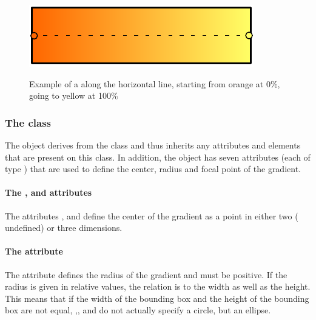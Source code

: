 \begin{figure}[!ht]
  \centering
  \includegraphics{figures/lingrad01.pdf}\\
  \caption{Example of a \LinearGradient along the horizontal line, starting from orange at 0\%, 
	 going to yellow at 100\%}
  \label{fig:lingrad}
\end{figure}


\subsubsection{The  class}
\label{radialgradient-class}


The \RadialGradient object derives from the \GradientBase class and thus
inherits any attributes and elements that are present on this class.
In addition, the \RadialGradient object has seven attributes (each of type \RelAbsVector) that are used to define the center, radius and focal point of the gradient.



\paragraph{The \fixttspace{}, \fixttspace{} and \fixttspace{} attributes}

The attributes ,  and  define the center of the gradient as a point in either two ( undefined) or three dimensions.


\paragraph{The \fixttspace{} attribute}

The attribute  defines the radius of the gradient and must be positive. If the radius is given in relative values, the relation is to the width as well as the height. This means that 
if the width of the bounding box and the height of the bounding box are not equal, ,,
and  do not actually specify a circle, but an ellipse.

